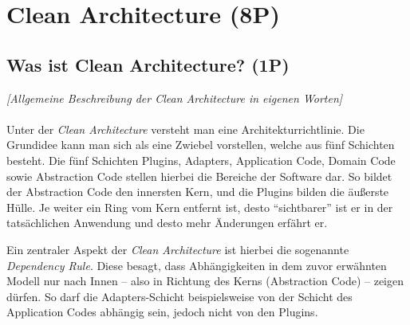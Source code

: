 
\titlespacing*{\chapter}{0pt}{-30mm}{10pt}
  
\chapter{Clean Architecture (8P)}
\pagestyle{scrheadings}
\clearscrheadfoot
{}
\setcounter{page}{2}
\ofoot[\pagemark]{\pagemark}
\onehalfspacing

\section{Was ist Clean Architecture? (1P)}
\emph{[Allgemeine Beschreibung der Clean Architecture in eigenen Worten]}
\\
\\
\noindent Unter der \emph{Clean Architecture} versteht man eine Architekturrichtlinie. Die Grundidee kann man sich als eine Zwiebel vorstellen, welche aus fünf Schichten besteht. Die fünf Schichten Plugins, Adapters, Application Code, Domain Code sowie Abstraction Code stellen hierbei die Bereiche der Software dar. So bildet der Abstraction Code den innersten Kern, und die Plugins bilden die äußerste Hülle. Je weiter ein Ring vom Kern entfernt ist, desto \enquote{sichtbarer} ist er in der tatsächlichen Anwendung und desto mehr Änderungen erfährt er.

Ein zentraler Aspekt der \emph{Clean Architecture} ist hierbei die sogenannte \emph{Dependency Rule}. Diese besagt, dass Abhängigkeiten in dem zuvor erwähnten Modell nur nach Innen -- also in Richtung des Kerns (Abstraction Code) -- zeigen dürfen. So darf die Adapters-Schicht beispielsweise von der Schicht des Application Codes abhängig sein, jedoch nicht von den Plugins.

